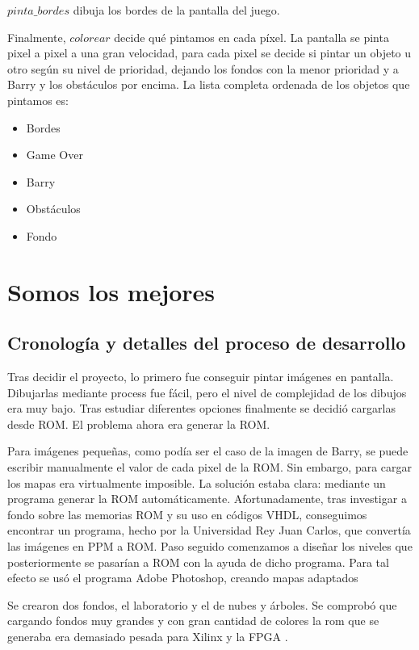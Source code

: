 \documentclass[11pt, a4paper, spanish, openright, twoside]{book}
\begin{document}
$pinta\_bordes$ dibuja los bordes de la pantalla del juego.

Finalmente, $colorear$ decide qué pintamos en cada píxel. La pantalla se pinta pixel a pixel a una gran velocidad, para cada pixel se decide si pintar un objeto u otro según su nivel de prioridad, dejando los fondos con la menor prioridad y a Barry y los obstáculos por encima. La lista completa ordenada de los objetos que pintamos es:
\begin{itemize}
	\item Bordes
	\item Game Over
	\item Barry
	\item Obstáculos
	\item Fondo
\end{itemize}

\section{Somos los mejores }
\subsection{Cronología y detalles del proceso de desarrollo}
Tras decidir el proyecto, lo primero fue conseguir pintar imágenes en pantalla. Dibujarlas mediante process fue fácil, pero el nivel de complejidad de los dibujos era muy bajo. Tras estudiar diferentes opciones finalmente se decidió cargarlas desde ROM.
El problema ahora era generar la ROM.

Para imágenes pequeñas, como podía ser el caso de la imagen de Barry, se puede escribir manualmente el valor de cada pixel de la ROM. Sin embargo, para cargar los mapas era virtualmente imposible. La solución estaba clara: mediante un programa generar la ROM automáticamente. Afortunadamente, tras investigar a fondo sobre las memorias ROM y su uso en códigos VHDL, conseguimos encontrar un programa, hecho por la Universidad Rey Juan Carlos, que convertía las imágenes en PPM a ROM. Paso seguido comenzamos a diseñar los niveles que posteriormente se pasarían a ROM con la ayuda de dicho programa. Para tal efecto se usó el programa Adobe Photoshop, creando mapas adaptados 

Se crearon dos fondos, el laboratorio y el de nubes y árboles. Se comprobó que cargando fondos muy grandes y con gran cantidad de colores la rom que se generaba era demasiado pesada para Xilinx y la FPGA . 
\end{document}

